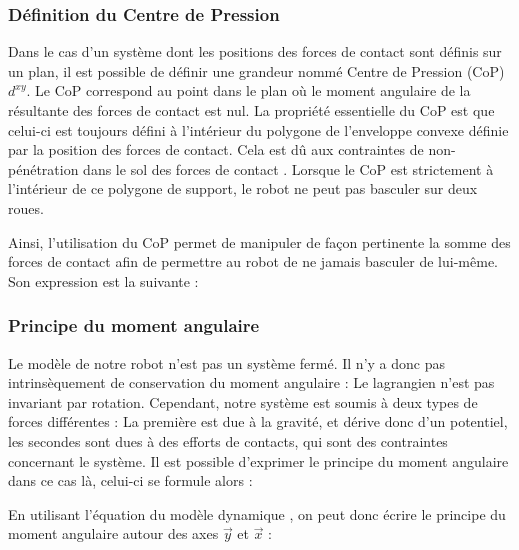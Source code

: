 			\subsubsection{Définition du Centre de Pression}
			
				Dans le cas d'un système dont les positions des forces de contact sont définis sur un plan, il est possible de définir une grandeur nommé Centre de Pression (CoP) $d^{xy}$.
				Le CoP correspond au point dans le plan où le moment angulaire de la résultante des forces de contact est nul.
				La propriété essentielle du CoP est que celui-ci est toujours défini à l'intérieur du polygone de l'enveloppe convexe définie par la position des forces de contact.
				Cela est dû aux contraintes de non-pénétration dans le sol des forces de contact .
				Lorsque le CoP est strictement à l'intérieur de ce polygone de support, le robot ne peut pas basculer sur deux roues.
				
				Ainsi, l'utilisation du CoP permet de manipuler de façon pertinente la somme des forces de contact afin de permettre au robot de ne jamais basculer de lui-même.
				Son expression est la suivante :
				
			
			\subsubsection{Principe du moment angulaire}
			
				Le modèle de notre robot n'est pas un système fermé. Il n'y a donc pas intrinsèquement de conservation du moment angulaire : Le lagrangien n'est pas invariant par rotation.
				Cependant, notre système est soumis à deux types de forces différentes : La première est due à la gravité, et dérive donc d'un potentiel, les secondes sont dues à des efforts de contacts, qui sont des contraintes concernant le système.
				Il est possible d'exprimer le principe du moment angulaire dans ce cas là, celui-ci se formule alors :
				
				
				En utilisant l'équation du modèle dynamique , on peut donc écrire le principe du moment angulaire autour des axes $\vec{y}$ et $\vec{x}$ :
				
